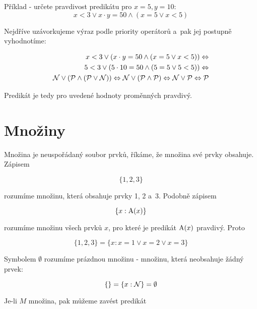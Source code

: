 Příklad - určete pravdivost predikátu pro \(x = 5, y = 10\):
\begin{equation}
x < 3 \lor x \cdot y = 50 \land (x = 5 \lor x < 5)
\end{equation}

Nejdříve uzávorkujeme výraz podle priority operátorů a~pak jej postupně vyhodnotíme:

\begin{equation}
\begin{split}
x < 3 \lor (x \cdot y = 50 \land (x = 5 \lor x < 5)) \Leftrightarrow \\
5 < 3 \lor (5 \cdot 10 = 50 \land (5 = 5 \lor 5 < 5)) \Leftrightarrow \\
\mathcal{N} \lor (\mathcal{P} \land (\mathcal{P} \lor \mathcal{N})) \Leftrightarrow \mathcal{N} \lor (\mathcal{P} \land \mathcal{P}) \Leftrightarrow \mathcal{N} \lor \mathcal{P} \Leftrightarrow \mathcal{P} 
\end{split}
\end{equation}

Predikát je tedy pro uvedené hodnoty proměnných pravdivý.

\section{Množiny}

Množina je neuspořádaný soubor prvků, říkáme, že množina své prvky obsahuje. Zápisem

\begin{equation}
\{1, 2, 3\}
\end{equation}

rozumíme množinu, která obsahuje prvky 1, 2 a~3. Podobně zápisem

\begin{equation}
\{x: \mathrm{A}(x)\}
\end{equation}

rozumíme množinu všech prvků \(x\), pro které je predikát \(\mathrm{A}(x)\) pravdivý. Proto

\begin{equation}
\{1, 2, 3\} = \{x: x = 1 \lor x = 2 \lor x = 3\}
\end{equation}

Symbolem \(\emptyset\) rozumíme prázdnou množinu - množinu, která neobsahuje žádný prvek:

\begin{equation}
\{\} = \{x: \mathcal{N}\} = \emptyset
\end{equation}

Je-li \(M\) množina, pak můžeme zavést predikát

